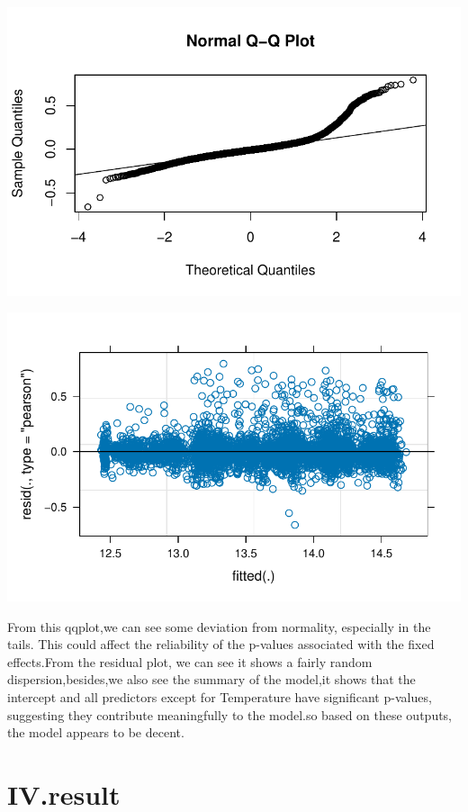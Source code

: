 \documentclass[
  letterpaper,
  DIV=11,
  numbers=noendperiod]{scrartcl}
\begin{document}
\includegraphics{678final_files/figure-pdf/unnamed-chunk-16-1.pdf}

\includegraphics{678final_files/figure-pdf/unnamed-chunk-16-2.pdf}

From this qqplot,we can see some deviation from normality, especially in
the tails. This could affect the reliability of the p-values associated
with the fixed effects.From the residual plot, we can see it shows a
fairly random dispersion,besides,we also see the summary of the model,it
shows that the intercept and all predictors except for Temperature have
significant p-values, suggesting they contribute meaningfully to the
model.so based on these outputs, the model appears to be decent.

\hypertarget{iv.result}{%
\section{IV.result}\label{iv.result}}
\end{document}
